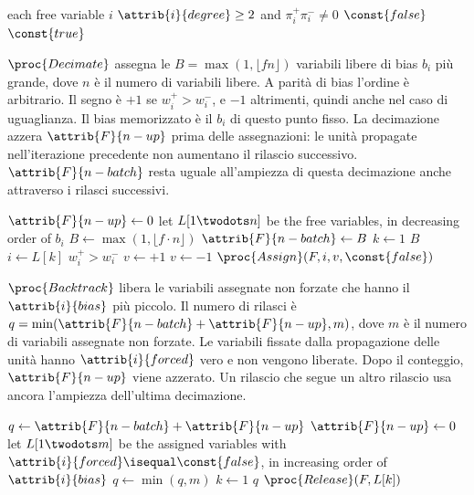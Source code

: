\begin{codebox}
\li \For each free variable $i$
\li     \Do
            \If $\attrib{i}{degree} \geq 2$ and $\pi_i^+ \pi_i^- \neq 0$
\li             \Then \Return $\const{false}$
                \End
        \End
\li \Return $\const{true}$
\end{codebox}

$\proc{Decimate}$ assegna le $B=\max(1,\lfloor f n\rfloor)$ variabili libere di bias $b_i$ più grande, dove $n$ è il numero di variabili libere.
A parità di bias l'ordine è arbitrario.
Il segno è $+1$ se $w_i^+>w_i^-$, e $-1$ altrimenti, quindi anche nel caso di uguaglianza.
Il bias memorizzato è il $b_i$ di questo punto fisso.
La decimazione azzera $\attrib{F}{n-up}$ prima delle assegnazioni: le unità propagate nell'iterazione precedente non aumentano il rilascio successivo.
$\attrib{F}{n-batch}$ resta uguale all'ampiezza di questa decimazione anche attraverso i rilasci successivi.

\begin{codebox}
\li $\attrib{F}{n-up} \gets 0$
\li let $L[1 \twodots n]$ be the free variables,
\zi     in decreasing order of $b_i$
\li $B \gets \max(1, \lfloor f \cdot n \rfloor)$
\li $\attrib{F}{n-batch} \gets B$
\li \For $k \gets 1$ \To $B$
\li     \Do
            $i \gets L[k]$
\li         \If $w_i^+ > w_i^-$
\li             \Then $v \gets +1$
\li             \Else $v \gets -1$
                \End
\li         $\proc{Assign}(F, i, v, \const{false})$
        \End
\end{codebox}

$\proc{Backtrack}$ libera le variabili assegnate non forzate che hanno il $\attrib{i}{bias}$ più piccolo.
Il numero di rilasci è $q=\min(\attrib{F}{n-batch}+\attrib{F}{n-up}, m)$, dove $m$ è il numero di variabili assegnate non forzate.
Le variabili fissate dalla propagazione delle unità hanno $\attrib{i}{forced}$ vero e non vengono liberate.
Dopo il conteggio, $\attrib{F}{n-up}$ viene azzerato.
Un rilascio che segue un altro rilascio usa ancora l'ampiezza dell'ultima decimazione.

\begin{codebox}
\li $q \gets \attrib{F}{n-batch} + \attrib{F}{n-up}$
\li $\attrib{F}{n-up} \gets 0$
\li let $L[1 \twodots m]$ be the assigned variables
\zi     with $\attrib{i}{forced} \isequal \const{false}$,
\zi     in increasing order of $\attrib{i}{bias}$
\li $q \gets \min(q, m)$
\li \For $k \gets 1$ \To $q$
\li     \Do $\proc{Release}(F, L[k])$
        \End
\end{codebox}

